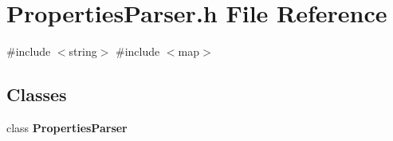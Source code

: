 \section{Properties\+Parser.\+h File Reference}
\label{_properties_parser_8h}
{\ttfamily \#include $<$string$>$}\newline
{\ttfamily \#include $<$map$>$}\newline
\subsection*{Classes}
\begin{DoxyCompactItemize}
\item 
class \textbf{ Properties\+Parser}
\end{DoxyCompactItemize}
